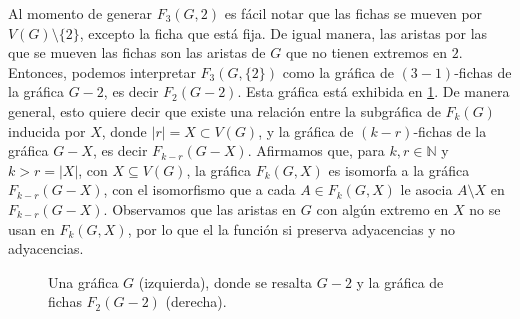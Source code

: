 Al momento de generar $F_3(G,2)$ es f\'acil notar que las fichas se mueven por
$V(G) \setminus \{2\}$, excepto la ficha que est\'a fija. De igual manera, las
aristas por las que se mueven las fichas son las aristas de $G$ que no tienen
extremos en $2$. Entonces, podemos interpretar $F_3(G,\{2\})$ como la
gr\'afica de $(3-1)$-fichas de la gr\'afica $G-2$, es decir $F_2(G-2)$. Esta
gr\'afica est\'a exhibida en \cref{fig:ex-tok-subgraph-aux}. De manera general,
esto quiere decir que existe una relaci\'on entre la subgr\'afica de $F_k(G)$
inducida por $X$, donde $|r|=X \subset V(G)$, y la gr\'afica de $(k-r)$-fichas
de la gr\'afica $G-X$, es decir $F_{k-r}(G-X)$. Afirmamos que, para $k,r \in
\mathbb{N}$ y $k>r = |X|$, con $X \subseteq V(G)$, la gr\'afica $F_k(G,X)$ es
isomorfa a la gr\'afica $F_{k-r}(G-X)$, con el isomorfismo que a cada $A \in
F_k(G,X)$ le asocia $A \setminus X$ en $F_{k-r}(G-X)$.   Observamos que las
aristas en $G$ con alg\'un extremo en $X$ no se usan en $F_k(G,X)$, por lo que
el la funci\'on si preserva adyacencias y no adyacencias.

\begin{figure}[ht!]
    \centering
    \caption{Una gr\'afica $G$ (izquierda), donde se resalta $G-2$ y la 
    gr\'afica de fichas $F_2(G-2)$ (derecha).}
    \label{fig:ex-tok-subgraph-aux}
\end{figure}

